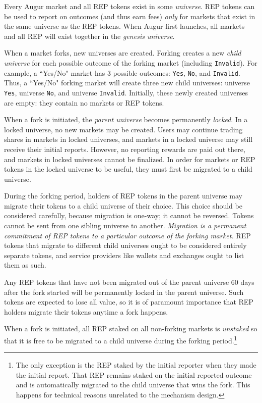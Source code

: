 \documentclass[floatfix,reprint,nofootinbib,amsmath,amssymb,epsfig,pre,floats,letterpaper,groupedaffiliation]{revtex4-1}
\theoremstyle{definition}
\theoremstyle{definition}
\begin{document}
Every Augur market and all REP tokens exist in some \textit{universe}.  REP tokens can be used to report on outcomes (and thus earn fees) \textit{only} for markets that exist in the same universe as the REP tokens.  When Augur first launches, all markets and all REP will exist together in the \textit{genesis universe}.

When a market forks, new universes are created.  Forking creates a new \textit{child universe} for each possible outcome of the forking market (including \texttt{Invalid}).  For example, a ``Yes/No" market has 3 possible outcomes: \texttt{Yes}, \texttt{No}, and \texttt{Invalid}.  Thus, a ``Yes/No" forking market will create three new child universes: universe \texttt{Yes}, universe \texttt{No}, and universe \texttt{Invalid}.  Initially, these newly created universes are empty: they contain no markets or REP tokens.

When a fork is initiated, the \textit{parent universe} becomes permanently \textit{locked}.  In a locked universe, no new markets may be created.  Users may continue trading shares in markets in locked universes, and markets in a locked universe may still receive their initial reports. However, no reporting rewards are paid out there, and markets in locked universes cannot be finalized.  In order for markets or REP tokens in the locked universe to be useful, they must first be migrated to a child universe.

During the forking period, holders of REP tokens in the parent universe may migrate their tokens to a child universe of their choice.  This choice should be considered carefully, because migration is one-way; it cannot be reversed.  Tokens cannot be sent from one sibling universe to another.  \textit{Migration is a permanent commitment of REP tokens to a particular outcome of the forking market.}  REP tokens that migrate to different child universes ought to be considered entirely separate tokens, and service providers like wallets and exchanges ought to list them as such.

Any REP tokens that have not been migrated out of the parent universe 60 days after the fork started will be permanently locked in the parent universe. Such tokens are expected to lose all value, so it is of paramount importance that REP holders migrate their tokens anytime a fork happens.

When a fork is initiated, all REP staked on all non-forking markets is \textit{unstaked} so that it is free to be migrated to a child universe during the forking period.\footnote{The only exception is the REP staked by the initial reporter when they made the initial report.  That REP remains staked on the initial reported outcome and is automatically migrated to the child universe that wins the fork. This happens for technical reasons unrelated to the mechanism design.}
\end{document}
